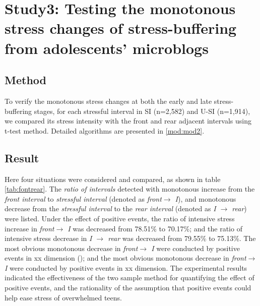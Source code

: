 \section{Study3: Testing the monotonous stress changes of stress-buffering from adolescents' microblogs} 
\subsection{Method}
To verify the monotonous stress changes at both the early and late stress-buffering stages, 
for each stressful interval in SI (n=2,582) and U-SI (n=1,914), 
we compared its stress intensity with the front and rear adjacent intervals using t-test method. 
Detailed algorithms are presented in \ref{mod:mod2}. 

\subsection{Result}
Here four situations were considered and compared, 
as shown in table \ref{tab:fontrear}. 
The \emph{ratio of intervals} detected with monotonous increase from the \emph{front interval} to \emph{stressful interval} (denoted as \emph{front$ \rightarrow$ I}),
and monotonous decrease from the \emph{stressful interval} to the \emph{rear interval} (denoted as \emph{I $\rightarrow$ rear}) were listed. 
Under the effect of positive events, 
the ratio of intensive stress increase in \emph{front$ \rightarrow$ I} was decreased from 78.51\% to 70.17\%; 
and the ratio of intensive stress decrease in \emph{I $\rightarrow$ rear} was decreased from 79.55\% to 75.13\%. 
The most obvious monotonous decrease in \emph{front$ \rightarrow$ I} were conducted by positive events in xx dimension (); 
and the most obvious monotonous decrease in \emph{front$ \rightarrow$ I} were conducted by positive events in xx dimension. 
The experimental results indicated the effectiveness of the two sample method for quantifying the effect of positive events, 
and the rationality of the assumption that positive events could help ease stress of overwhelmed teens. 
